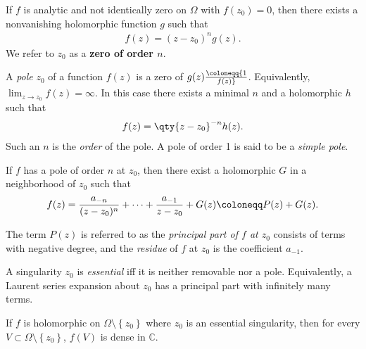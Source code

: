 \begin{definition}[Zeros]

If \(f\) is analytic and not identically zero on \(\Omega\) with
\(f(z_0) = 0\), then there exists a nonvanishing holomorphic function
\(g\) such that
\begin{align*}
f(z) = (z-z_0)^n g(z)
.\end{align*}
We refer to \(z_0\) as a \textbf{zero of order \(n\)}.

\end{definition}

\begin{definition}

A \emph{pole} \(z_0\) of a function \(f(z)\) is a zero of
\(g(z) \coloneqq{1\over f(z)}\). Equivalently,
\(\lim_{z\to z_0} f(z) = \infty\). In this case there exists a minimal
\(n\) and a holomorphic \(h\) such that
\begin{align*}  
f(z) = \qty{z-z_0}^{-n} h(z)
.\end{align*}
Such an \(n\) is the \emph{order} of the pole. A pole of order 1 is said
to be a \emph{simple pole}.

\end{definition}

\begin{definition}

If \(f\) has a pole of order \(n\) at \(z_0\), then there exist a
holomorphic \(G\) in a neighborhood of \(z_0\) such that
\begin{align*}
f(z) = {a_{-n} \over (z-z_0)^n } + \cdots + {a_{-1} \over z-z_0} + G(z) \coloneqq P(z) + G(z)
.\end{align*}

The term \(P(z)\) is referred to as the \emph{principal part of \(f\) at
\(z_0\)} consists of terms with negative degree, and the \emph{residue}
of \(f\) at \(z_0\) is the coefficient \(a_{-1}\).

\end{definition}

\begin{definition}

A singularity \(z_0\) is \emph{essential} iff it is neither removable
nor a pole. Equivalently, a Laurent series expansion about \(z_0\) has a
principal part with infinitely many terms.

\end{definition}

\begin{theorem}\label{Casorati}

If \(f\) is holomorphic on \(\Omega\setminus\left\{{z_0}\right\}\) where
\(z_0\) is an essential singularity, then for every
\(V\subset \Omega\setminus\left\{{z_0}\right\}\), \(f(V)\) is dense in
\({\mathbb{C}}\).

\end{theorem}

